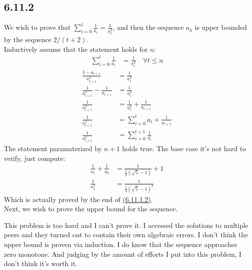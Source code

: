 \documentclass[]{article}
\begin{document}
    \subsection*{6.11.2}
        We wish to prove that $\sum_{i = 0}^t\frac{1}{a_i} = \frac{1}{a_t^2}$, and then the sequence $a_k$ is upper bounded by the sequence $2/(t + 2)$. 
        \\
        Inductively assume that the statement holds for $n$: 
        \begin{align*}\tag{6.11.2.1}\label{eqn:6.11.2.1}
            \sum_{i = 0}^{t}\frac{1}{a_i} &= \frac{1}{a_t^2}\quad \forall t \le n
        \end{align*}
        \begin{align*}\tag{6.11.2.2}\label{eqn:6.11.2.2}
            \frac{1 - a_{t + 1}}{a^2_{t + 1}} &= \frac{1}{a_t^2}
            \\
            \frac{1}{a^2_{t + 1}} - \frac{1}{a_{t + 1}} &=  \frac{1}{a_t^2}
            \\
            \frac{1}{a_{t + 1}^2} &= \frac{1}{a_t^2} + \frac{1}{a_{t + 1}}
            \\
            \frac{1}{a_{t + 1}^2} &= \sum_{i = 0}^{t}a_i + \frac{1}{a_{t + 1}}
            \\
            \frac{1}{a^2_{t + 1}} &= \sum_{i = 0}^{t+1}\frac{1}{a_{i}}
        \end{align*}
        The statement paramaterized by $n + 1$ holds true. The base case it's not hard to verify, just compute: 
        \begin{align*}\tag{6.11.2.3}\label{eqn:6.11.2.3}
            \frac{1}{a_1} + \frac{1}{a_0} &= \frac{1}{\frac{1}{2}(\sqrt{5} - 1)} +1
            \\
            \frac{1}{a_1^2} &= 
            \frac{1}{\frac{1}{4}(\sqrt{5} - 1)^2}
        \end{align*}
        Which is actually proved by the end of \hyperref[eqn:6.11.1.2]{(6.11.1.2)}. 
        \\
        Next, we wish to prove the upper bound for the sequence. 
        \\[1.1em]
        \par
        This problem is too hard and I can't prove it. I accessed the solutions to multiple peers and they turned out to contain their own algebraic errors. I don't think the upper bound is proven via induction. I do know that the sequence approaches zero monotone. And judging by the amount of efforts I put into this problem, I don't think it's worth it. 
        \par
\end{document}
